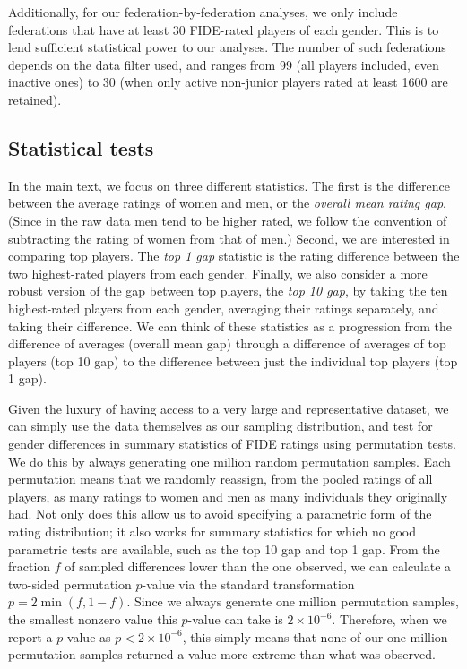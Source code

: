 \documentclass[9pt,twocolumn,twoside,lineno]{pnas-new}
\begin{document}
Additionally, for our federation-by-federation analyses, we only include federations that have at least 30 FIDE-rated players of each gender. This is to lend sufficient statistical power to our analyses. The number of such federations depends on the data filter used, and ranges from 99 (all players included, even inactive ones) to 30 (when only active non-junior players rated at least 1600 are retained).


\subsection*{Statistical tests} 

In the main text, we focus on three different statistics. The first is the difference between the average ratings of women and men, or the \emph{overall mean rating gap}. (Since in the raw data men tend to be higher rated, we follow the convention of subtracting the rating of women from that of men.) Second, we are interested in comparing top players. The \emph{top 1 gap} statistic is the rating difference between the two highest-rated players from each gender. Finally, we also consider a more robust version of the gap between top players, the \emph{top 10 gap}, by taking the ten highest-rated players from each gender, averaging their ratings separately, and taking their difference. We can think of these statistics as a progression from the difference of averages (overall mean gap) through a difference of averages of top players (top 10 gap) to the difference between just the individual top players (top 1 gap).

Given the luxury of having access to a very large and representative dataset, we can simply use the data themselves as our sampling distribution, and test for gender differences in summary statistics of FIDE ratings using permutation tests. We do this by always generating one million random permutation samples. Each permutation means that we randomly reassign, from the pooled ratings of all players, as many ratings to women and men as many individuals they originally had. Not only does this allow us to avoid specifying a parametric form of the rating distribution; it also works for summary statistics for which no good parametric tests are available, such as the top 10 gap and top 1 gap. From the fraction $f$ of sampled differences lower than the one observed, we can calculate a two-sided permutation $p$-value via the standard transformation $p = 2 \min(f, 1 - f)$. Since we always generate one million permutation samples, the smallest nonzero value this $p$-value can take is $2\times 10^{-6}$. Therefore, when we report a $p$-value as $p < 2\times 10^{-6}$, this simply means that none of our one million permutation samples returned a value more extreme than what was observed.
\end{document}
